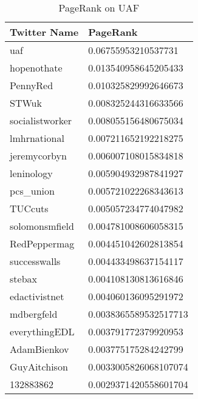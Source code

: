 \begin{table}%
\centering
\begin{tabular}{|l|l|}
\hline
Twitter Name & PageRank \\
\hline
uaf & 0.06755953210537731 \\
hopenothate & 0.013540958645205433 \\
PennyRed & 0.010325829992646673 \\
STWuk & 0.008325244316633566 \\
socialistworker & 0.008055156480675034 \\
lmhrnational & 0.007211652192218275 \\
jeremycorbyn & 0.006007108015834818 \\
leninology & 0.005904932987841927 \\
pcs\_union & 0.005721022268343613 \\
TUCcuts & 0.005057234774047982 \\
solomonsmfield & 0.004781008606058315 \\
RedPeppermag & 0.004451042602813854 \\
successwalls & 0.004433498637154117 \\
stebax & 0.004108130813616846 \\
edactivistnet & 0.004060136095291972 \\
mdbergfeld & 0.0038365589532517713 \\
everythingEDL & 0.003791772379920953 \\
AdamBienkov & 0.003775175284242799 \\
GuyAitchison & 0.0033005826068107074 \\
132883862 & 0.0029371420558601704 \\
\hline
\end{tabular}
\caption{PageRank on UAF}
\label{tab:uafpagerank}
\end{table}

